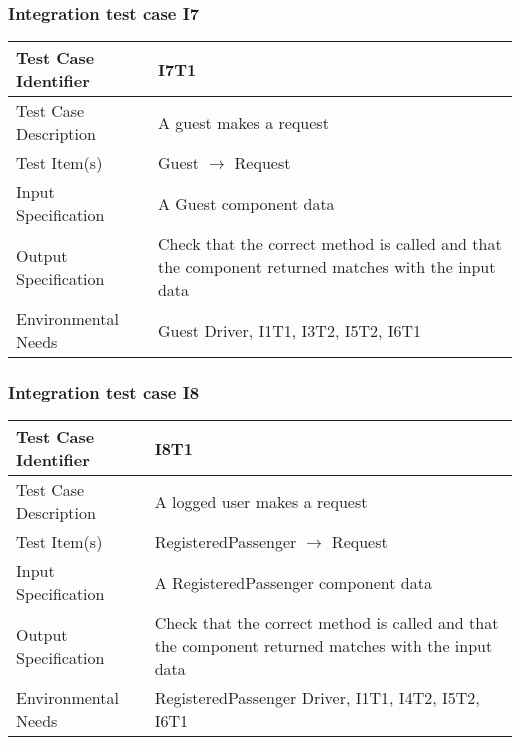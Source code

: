 		\subsubsection{Integration test case I7}
		\begin{center}
			\begin{tabular}{ |l p{10cm}| } \hline
				Test Case Identifier & I7T1 \\ \hline
				Test Case Description & A guest makes a request \\ \hline
				Test Item(s) & Guest $\rightarrow$ Request \\ \hline
				Input Specification & A Guest component data \\ \hline
				Output Specification & Check that the correct method is called and that the component returned matches
				with the input data \\ \hline
				Environmental Needs & Guest Driver, I1T1, I3T2, I5T2, I6T1 \\ \hline
			\end{tabular}
		\end{center}
		\subsubsection{Integration test case I8}
		\begin{center}
			\begin{tabular}{ |l p{10cm}| } \hline
				Test Case Identifier & I8T1 \\ \hline
				Test Case Description & A logged user makes a request \\ \hline
				Test Item(s) & RegisteredPassenger $\rightarrow$ Request \\ \hline
				Input Specification & A RegisteredPassenger component data \\ \hline
				Output Specification & Check that the correct method is called and that the component returned matches
				with the input data \\ \hline
				Environmental Needs & RegisteredPassenger Driver, I1T1, I4T2, I5T2, I6T1 \\ \hline
			\end{tabular}
		\end{center}
